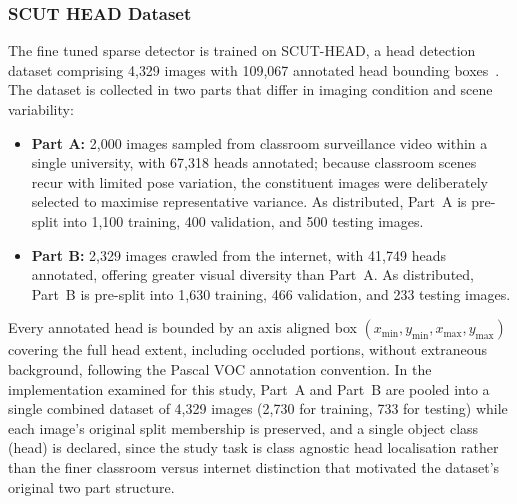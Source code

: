 \documentclass[12pt,a4paper]{report}
\begin{document}
\subsubsection{SCUT HEAD Dataset}
The fine tuned sparse detector is trained on SCUT-HEAD, a head detection dataset comprising 4{,}329 images with 109{,}067 annotated head bounding boxes~\cite{peng2018scuthead}. The dataset is collected in two parts that differ in imaging condition and scene variability:

\begin{itemize}
	\item \textbf{Part A:} 2{,}000 images sampled from classroom surveillance video within a single university, with 67{,}318 heads annotated; because classroom scenes recur with limited pose variation, the constituent images were deliberately selected to maximise representative variance. As distributed, Part~A is pre-split into 1{,}100 training, 400 validation, and 500 testing images.
	\item \textbf{Part B:} 2{,}329 images crawled from the internet, with 41{,}749 heads annotated, offering greater visual diversity than Part~A. As distributed, Part~B is pre-split into 1{,}630 training, 466 validation, and 233 testing images.
\end{itemize}

Every annotated head is bounded by an axis aligned box $(x_{\min}, y_{\min}, x_{\max}, y_{\max})$ covering the full head extent, including occluded portions, without extraneous background, following the Pascal VOC annotation convention. In the implementation examined for this study, Part~A and Part~B are pooled into a single combined dataset of 4{,}329 images (2{,}730 for training, 733 for testing) while each image's original split membership is preserved, and a single object class (head) is declared, since the study task is class agnostic head localisation rather than the finer classroom versus internet distinction that motivated the dataset's original two part structure.
\end{document}
